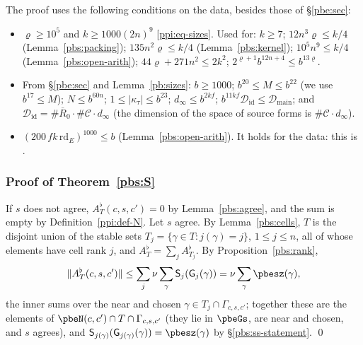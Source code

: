 \documentclass[10pt]{amsart}
\theoremstyle{definition}
\theoremstyle{remark}
\providecommand{\aubar}[1]{\overline{#1}}
\providecommand{\pbDid}{\mathcal D_{\mathrm{id}}}
\providecommand{\pbDmain}{\mathcal D_{\mathrm{main}}}
\providecommand{\pbR}{\overline R_0}
\begin{document}
The proof uses the following conditions on the data, besides those of \S\ref{pbe:sec}:
\begin{itemize}
\item[(Z1)] $\varrho\ge10^5$ and $k\ge1000(2n)^9$ \eqref{ppi:eq-sizes}. Used for: $k\ge7$;
$12n^3\varrho\le k/4$ (Lemma~\ref{pbs:packing}); $135n^2\varrho\le k/4$ (Lemma~\ref{pbs:kernel});
$10^5n^9\le k/4$ (Lemma~\ref{pbs:open-arith}); $44\varrho+271n^2\le2k^2$; $2^{\varrho+1}b^{12n+4}\le
b^{13\varrho}$.
\item[(Z2)] From \S\ref{pbe:sec} and Lemma~\ref{pb:sizes}: $b\ge1000$; $b^{20}\le M\le b^{22}$ (we use
$b^{17}\le M$); $N\le b^{60n}$; $1\le|\kappa_\tau|\le b^{23}$; $d_\infty\le b^{2kf}$; $b^{11kf}\pbDid\le
\pbDmain$; and $\pbDid=\#\pbR\cdot\#\mathcal C\cdot d_\infty$ (the dimension of the space of source forms
is $\#\mathcal C\cdot d_\infty$).
\item[(Z3)] $(200\,fk\,\mathrm{rd}_E)^{1000}\le b$ (Lemma~\ref{pbs:open-arith}). It holds for the data: this is
{\cite[Lemma~13.4(S7)(d)]{P46}}.
\end{itemize}

\subsubsection{Proof of Theorem~\ref{pbs:S}}\label{pbs:ss-proof}

If $s$ does not agree, $A^\flat_T(c,s,c')=0$ by Lemma~\ref{pbs:agree}, and the sum is empty by
Definition~\ref{ppi:def-N}. Let $s$ agree. By Lemma~\ref{pbs:cells}, $T$ is the disjoint union of the
stable sets $T_j=\{\gamma\in T:j(\gamma)=j\}$, $1\le j\le n$, all of whose elements have cell rank $j$, and
$A^\flat_T=\sum_jA^\flat_{T_j}$. By Proposition~\ref{pbs:rank},
\[
\|A^\flat_T(c,s,c')\|\le\sum_j\nu\sum_{\gamma}\mathsf S_j(\mathsf G_j(\gamma))=\nu\sum_\gamma\pbesz(\gamma),
\]
the inner sums over the near and chosen $\gamma\in T_j\cap\Gamma_{c,s,c'}$; together these are the elements
of $\pbeN(c,c')\cap T\cap\Gamma_{c,s,c'}$ (they lie in $\pbeGs$, are near and chosen, and $s$ agrees), and
$\mathsf S_{j(\gamma)}(\mathsf G_{j(\gamma)}(\gamma))=\pbesz(\gamma)$ by \S\ref{pbs:ss-statement}. \qed



\providecommand{\auO}{\mathcal O}
\providecommand{\aubar}[1]{\overline{#1}}
\providecommand{\pbeq}{\mathsf q}
\providecommand{\pbvol}{\operatorname{vol}}
\providecommand{\pbdeg}{\operatorname{deg}}
\providecommand{\pbg}{\mathsf g}
\providecommand{\pbel}{\ell}
\providecommand{\pbsrb}{\rho_\square}
\providecommand{\pbsth}{\theta_\square}
\providecommand{\pbsK}{\mathsf K}
\providecommand{\pbsp}{\mathsf p}
\providecommand{\pboZ}{\mathsf Z}
\providecommand{\pboF}{\mathsf F}
\providecommand{\pboFd}{\mathsf F'}
\providecommand{\pboO}{\Omega}
\providecommand{\pbonu}{\nu}
\providecommand{\pboU}{U^0}
\providecommand{\pboR}{R^0}
\providecommand{\pbocG}{c_G}
\providecommand{\pboV}{\operatorname{vol}\mathrm U}
\providecommand{\pboq}{\mathsf q}
\providecommand{\pboS}{\mathcal S}
\providecommand{\pboB}{\mathsf B}
\providecommand{\pbod}{\mathsf d}
\end{document}
